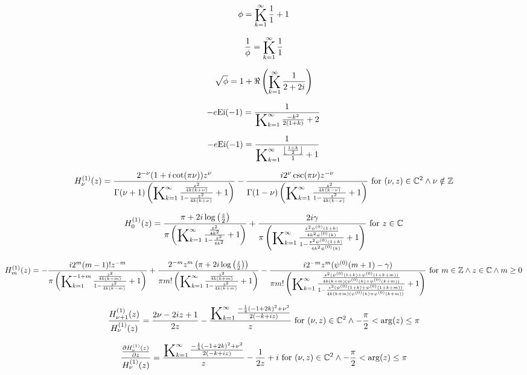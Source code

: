 \documentclass{article}
\newcommand{\bigK}{\mathop{\raisebox{-5pt}{\huge K}}}
\begin{document}
\[\phi =\bigK_{k=1}^{\infty}\frac{1}{1}+1\] 

\[\frac{1}{\phi }=\bigK_{k=1}^{\infty}\frac{1}{1}\] 

\[\sqrt{\phi }=1+\Re\left(\bigK_{k=1}^{\infty}\frac{1}{2+2 i}\right)\] 

\[-e \text{Ei}(-1)=\frac{1}{\bigK_{k=1}^{\infty}\frac{-k^2}{2 (1+k)}+2}\] 

\[-e \text{Ei}(-1)=\frac{1}{\bigK_{k=1}^{\infty}\frac{\left\lfloor \frac{1+k}{2}\right\rfloor }{1}+1}\] 

\[H_{\nu }^{(1)}(z)=\frac{2^{-\nu } (1+i \cot (\pi  \nu )) z^{\nu }}{\Gamma (\nu +1) \left(\bigK_{k=1}^{\infty}\frac{\frac{z^2}{4 k (k+\nu )}}{1-\frac{z^2}{4 k (k+\nu )}}+1\right)}-\frac{i 2^{\nu } \csc (\pi  \nu ) z^{-\nu }}{\Gamma (1-\nu ) \left(\bigK_{k=1}^{\infty}\frac{\frac{z^2}{4 k (k-\nu )}}{1-\frac{z^2}{4 k (k-\nu )}}+1\right)}\text{ for }(\nu ,z)\in \mathbb{C}^2\land \nu \notin \mathbb{Z}\] 

\[H_0^{(1)}(z)=\frac{\pi +2 i \log \left(\frac{z}{2}\right)}{\pi  \left(\bigK_{k=1}^{\infty}\frac{\frac{z^2}{4 k^2}}{1-\frac{z^2}{4 k^2}}+1\right)}+\frac{2 i \gamma }{\pi  \left(\bigK_{k=1}^{\infty}\frac{\frac{z^2 \psi ^{(0)}(1+k)}{4 k^2 \psi ^{(0)}(k)}}{1-\frac{z^2 \psi ^{(0)}(1+k)}{4 k^2 \psi ^{(0)}(k)}}+1\right)}\text{ for }z\in \mathbb{C}\] 

\[H_m^{(1)}(z)=-\frac{i 2^m (m-1)! z^{-m}}{\pi  \left(\bigK_{k=1}^{-1+m}\frac{\frac{z^2}{4 k (k-m)}}{1-\frac{z^2}{4 k (k-m)}}+1\right)}+\frac{2^{-m} z^m \left(\pi +2 i \log \left(\frac{z}{2}\right)\right)}{\pi  m! \left(\bigK_{k=1}^{\infty}\frac{\frac{z^2}{4 k (k+m)}}{1-\frac{z^2}{4 k (k+m)}}+1\right)}-\frac{i 2^{-m} z^m (\psi ^{(0)}(m+1)-\gamma )}{\pi  m! \left(\bigK_{k=1}^{\infty}\frac{\frac{z^2 (\psi ^{(0)}(1+k)+\psi ^{(0)}(1+k+m))}{4 k (k+m) (\psi ^{(0)}(k)+\psi ^{(0)}(k+m))}}{1-\frac{z^2 (\psi ^{(0)}(1+k)+\psi ^{(0)}(1+k+m))}{4 k (k+m) (\psi ^{(0)}(k)+\psi ^{(0)}(k+m))}}+1\right)}\text{ for }m\in \mathbb{Z}\land z\in \mathbb{C}\land m\geq 0\] 

\[\frac{H_{\nu +1}^{(1)}(z)}{H_{\nu }^{(1)}(z)}=\frac{2 \nu -2 i z+1}{2 z}-\frac{\bigK_{k=1}^{\infty}\frac{-\frac{1}{4} (-1+2 k)^2+\nu ^2}{2 (-k+i z)}}{z}\text{ for }(\nu ,z)\in \mathbb{C}^2\land -\frac{\pi }{2}<\arg (z)\leq \pi\] 

\[\frac{\frac{\partial H_{\nu }^{(1)}(z)}{\partial z}}{H_{\nu }^{(1)}(z)}=\frac{\bigK_{k=1}^{\infty}\frac{-\frac{1}{4} (-1+2 k)^2+\nu ^2}{2 (-k+i z)}}{z}-\frac{1}{2 z}+i\text{ for }(\nu ,z)\in \mathbb{C}^2\land -\frac{\pi }{2}<\arg (z)\leq \pi\] 
\end{document}
